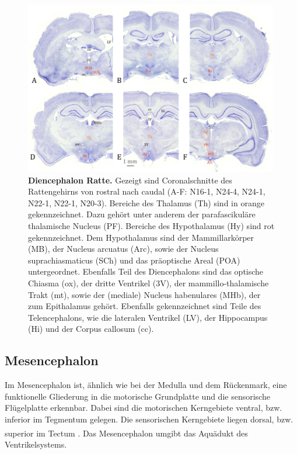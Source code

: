 \documentclass[12pt,a4paper,pdftex]{article}
\begin{document}
\begin{figure}[H]
	    \centering
	    \includegraphics[width=0.99\textwidth]{pictures/Bilder_Jule/Ratte/hypothalamus.png}
	    \caption[Diencephalon Ratte]{\textbf{Diencephalon Ratte.} Gezeigt sind Coronalschnitte des Rattengehirns von rostral nach caudal (A-F: N16-1, N24-4, N24-1, N22-1, N22-1, N20-3). Bereiche des Thalamus (Th) sind in orange gekennzeichnet. Dazu gehört unter anderem der parafascikuläre thalamische Nucleus (PF). Bereiche des Hypothalamus (Hy) sind rot gekennzeichnet. Dem Hypothalamus sind der Mammillarkörper (MB), der Nucleus arcuatus (Arc), sowie der Nucleus suprachiasmaticus (SCh) und das präoptische Areal (POA) untergeordnet. Ebenfalls Teil des Diencephalons sind das optische Chiasma (ox), der dritte Ventrikel (3V), der mammillo-thalamische Trakt (mt), sowie der (mediale) Nucleus habenulares (MHb), der zum Epithalamus gehört. Ebenfalls gekennzeichnet sind Teile des Telencephalons, wie die lateralen Ventrikel (LV), der Hippocampus (Hi) und der Corpus callosum (cc).}
	    \label{fig:Diencephalon_Ratte}
\end{figure}{}



\subsection{Mesencephalon}
\label{subsec:Mesencephalon} 

Im Mesencephalon ist, ähnlich wie bei der Medulla und dem Rückenmark, eine funktionelle Gliederung in die motorische Grundplatte und die sensorische Flügelplatte erkennbar. Dabei sind die motorischen Kerngebiete ventral, bzw. inferior im Tegmentum gelegen. Die sensorischen Kerngebiete liegen dorsal, bzw. superior im Tectum \textsuperscript{\cite[6]{trepel2011neuroanatomie}}. Das Mesencephalon umgibt das Aquädukt des Ventrikelsystems.
\end{document}

